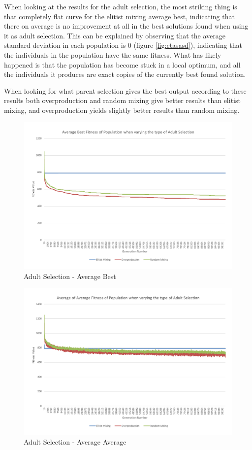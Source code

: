 When looking at the results for the adult selection, the most striking thing is that completely flat curve for the elitist mixing average best, indicating that there on average is no improvement at all in the best solutions found when using it as adult selection. This can be explained by observing that the average standard deviation in each population is 0 (figure \ref{fig:ctasasd}), indicating that the individuals in the population have the same fitness. What has likely happened is that the population has become stuck in a local optimum, and all the individuals it produces are exact copies of the currently best found solution.

When looking for what parent selection gives the best output according to these results both overproduction and random mixing give better results than elitist mixing, and overproduction yields slightly better results than random mixing.

\begin{figure}[thbp]
	\centerline{\includegraphics[width=\paperwidth]{figures/CircleTests/CircleTestAdultSelectionAverageBest.pdf}}
	\caption{Adult Selection - Average Best}
\end{figure}

\begin{figure}[thbp]
	\centerline{\includegraphics[width=\paperwidth]{figures/CircleTests/CircleTestAdultSelectionAverageAverage.pdf}}
	\caption{Adult Selection - Average Average}
\end{figure}

